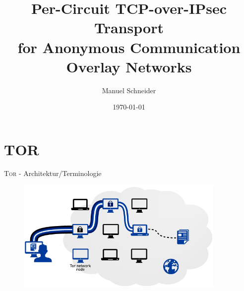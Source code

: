 \documentclass{beamer}
\title{Per-Circuit TCP-over-IPsec Transport\\for Anonymous Communication Overlay Networks}
\author{Manuel Schneider}
\institute{Albert Ludwigs Universität - Institut für Informatik}
\date{\today}
\begin{document}

\begin{frame}[plain]
  \titlepage
\end{frame}



\section{TOR}

\begin{frame}{\textsc{Tor} - Architektur/Terminologie}
  \begin{figure}
    \includegraphics[width=0.9\textwidth]{pics/tor}
  \end{figure}
\end{frame}
\end{document}
